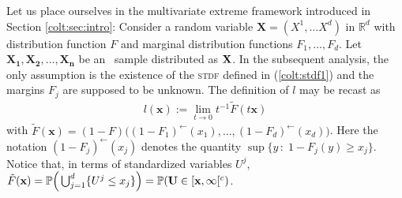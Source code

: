 Let us place ourselves in the multivariate extreme framework introduced in Section \ref{colt:sec:intro}:
 Consider a random variable $\mathbf{X} = (X^1, \ldots X^d)$ in
 $\mathbb{R}^d$ with %
distribution function $F$ and marginal distribution functions
$F_1,\ldots,F_d$.
Let $\mathbf{X_1,X_2,\ldots,X_n}$ be an \iid~sample distributed as $\mathbf X$.
In the subsequent analysis, the only assumption is the existence of
the \textsc{stdf} defined in  (\ref{colt:stdf1}) and
the margins $F_j$ are supposed to be unknown. The
definition of $l$ may be  recast as
\begin{align}
\label{colt:stdf}
l(\mathbf{x}):= \lim_{t \to 0} t^{-1} \tilde F (t\mathbf{x}) 
\end{align}
\noindent
with $\tilde F (\mathbf{x}) = (1-F) \big( (1-F_1)^\leftarrow(x_1),\ldots,
(1-F_d)^\leftarrow(x_d)  \big)$. Here the notation
$(1-F_j)^\leftarrow(x_j)$ denotes the quantity $\sup\{y\,:\; 1-F_j(y)
\ge x_j\}$. Notice that, in terms of standardized variables $U^j$, 
$\tilde F(\mathbf x) = \mathbb{P}\Big(\bigcup_{j=1}^d\{U^j\le x_j\}\Big) = \mathbb{P}(\mathbf
U\in [\mathbf x, \infty[^c)$.




